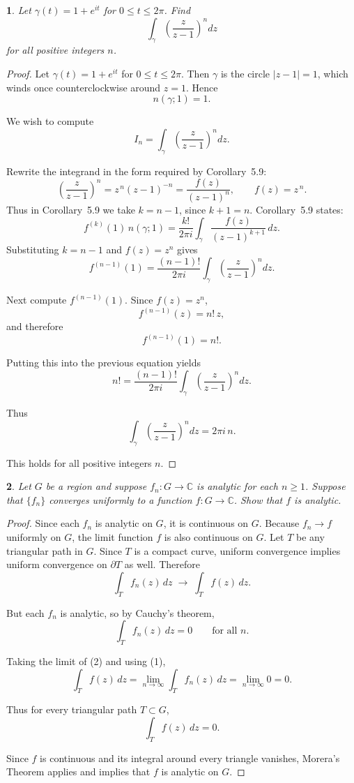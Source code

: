 \documentclass[12pt, a4paper]{report}
\theoremstyle{spaced}
\newtheorem{exercise}{}
\newcommand{\setexercise}[1]{\setcounter{exercise}{#1-1}}
\begin{document}
\setexercise{7}
\begin{exercise}
	Let $\gamma(t) = 1 + e^{it}$ for $0 \le t \le 2\pi$.
	Find
	\[
		\int_{\gamma} \left(\frac{z}{z-1}\right)^{n} dz
	\]
	for all positive integers $n$.
\end{exercise}

\begin{proof}
	Let $\gamma(t)=1+e^{it}$ for $0\le t\le 2\pi$.
	Then $\gamma$ is the circle $|z-1|=1$, which winds once counterclockwise around $z=1$.
	Hence
	\[
		n(\gamma;1)=1.
	\]

	We wish to compute
	\[
		I_n=\int_{\gamma}\left(\frac{z}{z-1}\right)^{n} dz.
	\]

	Rewrite the integrand in the form required by Corollary~5.9:
	\[
		\left(\frac{z}{z-1}\right)^n
		= z^{\,n}(z-1)^{-n}
		= \frac{f(z)}{(z-1)^{n}},
		\qquad f(z)=z^{\,n}.
	\]
	Thus in Corollary~5.9 we take $k=n-1$, since $k+1=n$.
	Corollary~5.9 states:
	\[
		f^{(k)}(1)\, n(\gamma;1)
		= \frac{k!}{2\pi i}
		\int_{\gamma} \frac{f(z)}{(z-1)^{k+1}}\, dz.
	\]
	Substituting $k=n-1$ and $f(z)=z^n$ gives
	\[
		f^{(n-1)}(1)
		= \frac{(n-1)!}{2\pi i}
		\int_{\gamma} \left(\frac{z}{z-1}\right)^{n} dz.
	\]

	Next compute $f^{(n-1)}(1)$.
	Since $f(z)=z^{n}$,
	\[
		f^{(n-1)}(z)=n!
		\, z,
	\]
	and therefore
	\[
		f^{(n-1)}(1)=n!.
	\]

	Putting this into the previous equation yields
	\[
		n!
		= \frac{(n-1)!}{2\pi i}
		\int_{\gamma} \left(\frac{z}{z-1}\right)^n dz.
	\]

	Thus
	\[
		\int_{\gamma}\left(\frac{z}{z-1}\right)^n dz
		= 2\pi i\, n.
	\]

	This holds for all positive integers $n$.
\end{proof}


\setexercise{8}
\begin{exercise}
	Let $G$ be a region and suppose $f_n : G \to \mathbb{C}$ is analytic for each $n \ge 1$.
	Suppose that $\{f_n\}$ converges uniformly to a function $f : G \to \mathbb{C}$.
	Show that $f$ is analytic.
\end{exercise}

\begin{proof}
	Since each $f_n$ is analytic on $G$, it is continuous on $G$.
	Because $f_n \to f$ uniformly on $G$, the limit function $f$ is also continuous on $G$.
	Let $T$ be any triangular path in $G$.
	Since $T$ is a compact curve, uniform convergence implies uniform convergence
	on $\partial T$ as well.
	Therefore
	\[
		\int_{T} f_n(z)\,dz \;\longrightarrow\; \int_{T} f(z)\,dz.
		\tag{1}
	\]

	But each $f_n$ is analytic, so by Cauchy's theorem,
	\[
		\int_{T} f_n(z)\,dz = 0 \qquad \text{for all } n.
		\tag{2}
	\]

	Taking the limit of (2) and using (1),
	\[
		\int_{T} f(z)\,dz
		= \lim_{n\to\infty} \int_{T} f_n(z)\,dz
		= \lim_{n\to\infty} 0
		= 0.
	\]

	Thus for every triangular path $T \subset G$,
	\[
		\int_{T} f(z)\,dz=0.
	\]

	Since $f$ is continuous and its integral around every triangle vanishes,
	Morera’s Theorem applies and implies that $f$ is analytic on $G$.
\end{proof}
\end{document}
